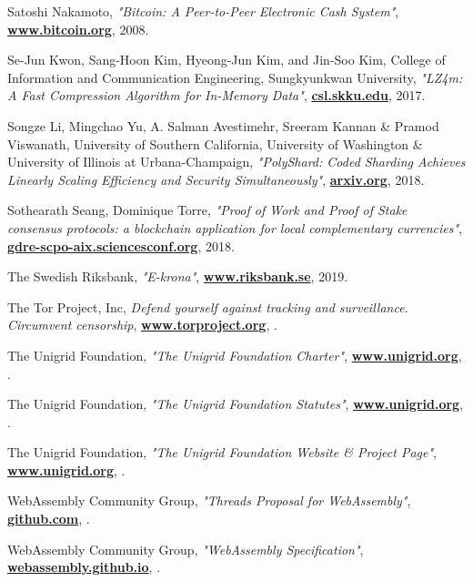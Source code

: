 \documentclass[10pt,a4paper,final]{article}
\let\oldhref\href
\renewcommand{\href}[2]{\oldhref{#1}{\bfseries#2}}
\begin{document}
\begin{thebibliography}{999}
	Satoshi Nakamoto,
	\emph{"Bitcoin: A Peer-to-Peer Electronic Cash System"},
	\href{http://www.bitcoin.org}{www.bitcoin.org},
	2008.

	Se-Jun Kwon, Sang-Hoon Kim, Hyeong-Jun Kim, and Jin-Soo Kim, College of Information and Communication Engineering, Sungkyunkwan University,
	\emph{"LZ4m: A Fast Compression Algorithm for In-Memory Data"},
	\href{http://csl.skku.edu/papers/icce17.pdf}{csl.skku.edu},
	2017.

	Songze Li, Mingchao Yu, A. Salman Avestimehr, Sreeram Kannan \& Pramod Viswanath, University of Southern California, University of Washington \& University of Illinois at Urbana-Champaign,
	\emph{"PolyShard: Coded Sharding Achieves Linearly Scaling Efficiency and Security Simultaneously"},
	\href{https://arxiv.org/pdf/1809.10361.pdf}{arxiv.org},
	2018.

	Sothearath Seang, Dominique Torre,
	\emph{"Proof of Work and Proof of Stake consensus protocols: a blockchain application for local complementary currencies"},
	\href{https://gdre-scpo-aix.sciencesconf.org/195470/document}{gdre-scpo-aix.sciencesconf.org},
	2018.

	The Swedish Riksbank,
	\emph{"E-krona"},
	\href{https://www.riksbank.se/en-gb/payments--cash/e-krona}{www.riksbank.se},
	2019.

	The Tor Project, Inc,
	\emph{Defend yourself against tracking and surveillance. Circumvent censorship},
	\href{https://www.torproject.org}{www.torproject.org},
	\the\year{}.

	The Unigrid Foundation,
	\emph{"The Unigrid Foundation Charter"},
	\href{https://www.unigrid.org/link-not-yet-available}{www.unigrid.org},
	\the\year{}.

	The Unigrid Foundation,
	\emph{"The Unigrid Foundation Statutes"},
	\href{https://www.unigrid.org/link-not-yet-available}{www.unigrid.org},
	\the\year{}.

	The Unigrid Foundation,
	\emph{"The Unigrid Foundation Website \& Project Page"},
	\href{https://www.unigrid.org}{www.unigrid.org},
	\the\year{}.

	WebAssembly Community Group,
	\emph{"Threads Proposal for WebAssembly"},
	\href{https://github.com/WebAssembly/threads}{github.com},
	\the\year{}.

	WebAssembly Community Group,
	\emph{"WebAssembly Specification"},
	\href{https://webassembly.github.io/spec/core/_download/WebAssembly.pdf}{webassembly.github.io},
	\the\year{}.


\end{thebibliography}
\end{document}
